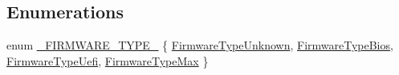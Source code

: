 \subsection*{Enumerations}
\begin{DoxyCompactItemize}
\item 
enum \mbox{\hyperlink{namespaceboost_1_1winapi_a95c858e6ecc52cd337e0e5e8ef33841d}{\+\_\+\+F\+I\+R\+M\+W\+A\+R\+E\+\_\+\+T\+Y\+P\+E\+\_\+}} \{ \mbox{\hyperlink{namespaceboost_1_1winapi_a95c858e6ecc52cd337e0e5e8ef33841daafe56173d1d969e15244366540697f35}{Firmware\+Type\+Unknown}}, 
\mbox{\hyperlink{namespaceboost_1_1winapi_a95c858e6ecc52cd337e0e5e8ef33841dada685e99d368dfc29110b553ecc33ded}{Firmware\+Type\+Bios}}, 
\mbox{\hyperlink{namespaceboost_1_1winapi_a95c858e6ecc52cd337e0e5e8ef33841da45bbf95e800fec0afb38b09d562c3af3}{Firmware\+Type\+Uefi}}, 
\mbox{\hyperlink{namespaceboost_1_1winapi_a95c858e6ecc52cd337e0e5e8ef33841da3fe3b8b235ef0537627ed6f7b6ba4849}{Firmware\+Type\+Max}}
 \}
\end{DoxyCompactItemize}
